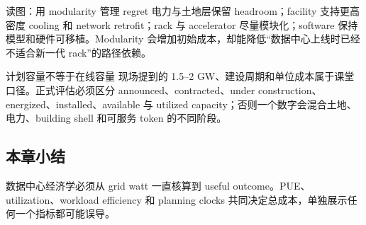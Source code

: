 
\begin{knowledgebox}{读图：用 modularity 管理 regret}
电力与土地层保留 headroom；facility 支持更高密度 cooling 和 network retrofit；rack 与 accelerator 尽量模块化；software 保持模型和硬件可移植。Modularity 会增加初始成本，却能降低“数据中心上线时已经不适合新一代 rack”的路径依赖。
\end{knowledgebox}

\begin{warningbox}{计划容量不等于在线容量}
现场提到的 1.5--2 GW、建设周期和单位成本属于课堂口径。正式评估必须区分 announced、contracted、under construction、energized、installed、available 与 utilized capacity；否则一个数字会混合土地、电力、building shell 和可服务 token 的不同阶段。
\end{warningbox}


\subsection{本章小结}

数据中心经济学必须从 grid watt 一直核算到 useful outcome。PUE、utilization、workload efficiency 和 planning clocks 共同决定总成本，单独展示任何一个指标都可能误导。


